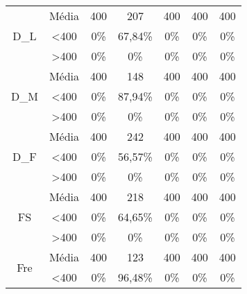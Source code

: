 \begin{table}[H]
\begin{tabular}{|c|c|ccccc|}
\multirow{3}{*}{D\_L}           & Média            & 400               & 207               & 400               & 400               & 400               \\
                                & \textless 400    & 0\%            & 67,84\%           & 0\%            & 0\%            & 0\%            \\
                                & \textgreater 400 & 0\%            & 0\%            & 0\%            & 0\%            & 0\%            \\ \hline
\multirow{3}{*}{D\_M}           & Média            & 400               & 148               & 400               & 400               & 400               \\
                                & \textless 400    & 0\%            & 87,94\%           & 0\%            & 0\%            & 0\%            \\
                                & \textgreater 400 & 0\%            & 0\%            & 0\%            & 0\%            & 0\%            \\ \hline
\multirow{3}{*}{D\_F}           & Média            & 400               & 242               & 400               & 400               & 400               \\
                                & \textless 400    & 0\%            & 56,57\%           & 0\%            & 0\%            & 0\%            \\
                                & \textgreater 400 & 0\%            & 0\%            & 0\%            & 0\%            & 0\%            \\ \hline
\multirow{3}{*}{FS}             & Média            & 400               & 218               & 400               & 400               & 400               \\
                                & \textless 400    & 0\%            & 64,65\%           & 0\%            & 0\%            & 0\%            \\
                                & \textgreater 400 & 0\%            & 0\%            & 0\%            & 0\%            & 0\%            \\ \hline
\multirow{3}{*}{Fre}            & Média            & 400               & 123               & 400               & 400               & 400               \\
                                & \textless 400    & 0\%            & 96,48\%           & 0\%            & 0\%            & 0\%            \\

\end{tabular}
\end{table}
